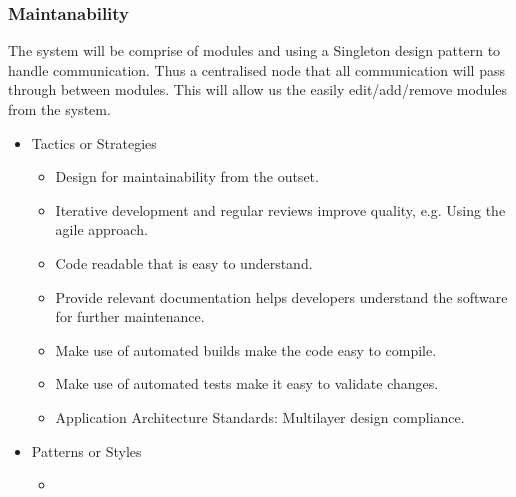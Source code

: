 \subsubsection{Maintanability}
		The system will be comprise of modules and using a Singleton design pattern to handle communication. Thus a centralised node that all communication will pass through between modules. This will allow us the easily edit/add/remove modules from the system.
		\begin{itemize}
	\item{Tactics or Strategies}
		\begin{itemize}
			\item Design for maintainability from the outset.
			\item Iterative development and regular reviews improve quality, e.g. Using the agile approach.
			\item Code readable that is easy to understand.
			\item Provide relevant documentation helps developers understand the software for further maintenance.
			\item Make use of automated builds make the code easy to compile.
			\item Make use of automated tests make it easy to validate changes.
			\item Application Architecture Standards: Multilayer design compliance.
		\end{itemize}
	\item{Patterns or Styles}
		\begin{itemize}
			\item
		\end{itemize}
\end{itemize}
